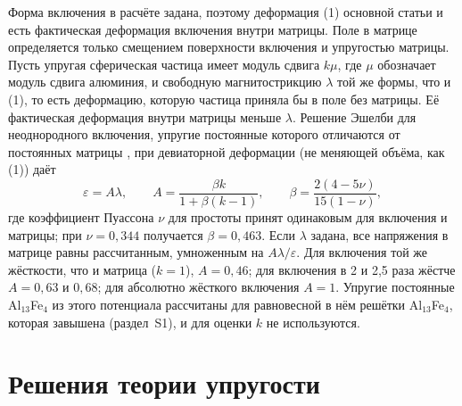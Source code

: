 \documentclass[11pt,a4paper]{article}
\begin{document}
Форма включения в расчёте задана, поэтому деформация
(1) основной статьи и есть фактическая деформация включения внутри матрицы.
Поле в матрице определяется только смещением поверхности включения
и упругостью матрицы. Пусть упругая сферическая частица имеет модуль сдвига
$k\mu$, где $\mu$ обозначает модуль сдвига алюминия, и свободную
магнитострикцию $\lambda$ той же формы, что и (1), то есть деформацию,
которую частица приняла бы в поле без матрицы. Её фактическая деформация
внутри матрицы меньше $\lambda$. Решение Эшелби для неоднородного включения,
упругие постоянные которого отличаются от постоянных матрицы
\cite{Eshelby1957,Mura1987}, при девиаторной деформации (не меняющей объёма,
как (1)) даёт
\begin{equation}
\varepsilon=A\lambda,\qquad A=\frac{\beta k}{1+\beta(k-1)},\qquad
\beta=\frac{2(4-5\nu)}{15(1-\nu)} ,
\end{equation}
где коэффициент Пуассона $\nu$ для простоты принят одинаковым для включения
и матрицы; при $\nu=0{,}344$ получается $\beta=0{,}463$. Если $\lambda$ задана,
все напряжения в матрице равны рассчитанным, умноженным на $A\lambda/\varepsilon$.
Для включения той же жёсткости, что и матрица ($k=1$), $A=0{,}46$; для
включения в 2 и 2{,}5 раза жёстче $A=0{,}63$ и $0{,}68$; для абсолютно
жёсткого включения $A=1$. Упругие постоянные Al$_{13}$Fe$_4$ из этого
потенциала рассчитаны для равновесной в нём решётки Al$_{13}$Fe$_4$,
которая завышена (раздел~S1), и для оценки $k$ не используются.

\section{Решения теории упругости}
\end{document}
